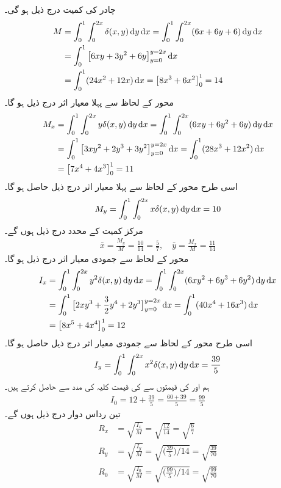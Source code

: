 چادر کی کمیت درج ذیل ہو گی۔
\begin{align*}
M&=\int_0^1\int_0^{2x}\delta(x,y)\dif y\dif x=\int_0^1\int_0^{2x}(6x+6y+6)\dif y\dif x\\
&=\int_0^1\big[6xy+3y^2+6y\big]_{y=0}^{y=2x}\dif x\\
&=\int_0^1(24x^2+12x)\dif x=\big[8x^3+6x^2\big]_0^1=14
\end{align*}
محور  کے لحاظ سے پہلا معیار اثر درج ذیل ہو گا۔
\begin{align*}
M_x&=\int_0^1\int_0^{2x}y\delta(x,y)\dif y\dif x=\int_0^1\int_0^{2x}(6xy+6y^2+6y)\dif y\dif x\\
&=\int_0^1\big[3xy^2+2y^3+3y^2\big]_{y=0}^{y=2x}\dif x=\int_0^1 (28x^3+12x^2)\dif x\\
&=\big[7x^4+4x^3\big]_0^1=11
\end{align*}
اسی طرح محور  کے  لحاظ سے پہلا معیار اثر درج ذیل حاصل ہو گا۔
\begin{align*}
M_y=\int_0^1\int_0^{2x}x\delta(x,y)\dif y\dif x=10
\end{align*}
مرکز کمیت کے محدد درج ذیل ہوں گے۔
\begin{align*}
\bar{x}=\frac{M_y}{M}=\frac{10}{14}=\frac{5}{7},\quad \bar{y}=\frac{M_x}{M}=\frac{11}{14}
\end{align*} 
محور  کے لحاظ  سے جمودی معیار اثر درج ذیل ہو گا۔
\begin{align*}
I_x&=\int_0^1\int_0^{2x}y^2\delta(x,y)\dif y\dif x=\int_0^1\int_0^{2x}(6xy^2+6y^3+6y^2)\dif y\dif x\\
&=\int_0^1\big[2xy^3+\frac{3}{2}y^4+2y^3\big]_{y=0}^{y=2x}\dif x=\int_0^1(40x^4+16x^3)\dif x\\
&=\big[8x^5+4x^4\big]_0^1=12
\end{align*}
اسی طرح  محور  کے لحاظ سے جمودی معیار اثر درج ذیل حاصل ہو گا۔
\begin{align*}
I_y=\int_0^1\int_0^{2x}x^2\delta(x,y)\dif y\dif x=\frac{39}{5}
\end{align*}
ہم  اور  کی قیمتوں سے  کی قیمت کلیہ  کی مدد  سے  حاصل کرتے ہیں۔
\begin{align*}
I_0=12+\frac{39}{5}=\frac{60+39}{5}=\frac{99}{5}
\end{align*}
تین رداس دوار درج ذیل ہوں گے۔
\begin{align*}
R_x&=\sqrt{\frac{I_x}{M}}=\sqrt{\frac{12}{14}}=\sqrt{\frac{6}{7}}\\
R_y&=\sqrt{\frac{I_y}{M}}=\sqrt{\big(\frac{39}{5}\big)/14}=\sqrt{\frac{39}{70}}\\
R_0&=\sqrt{\frac{I_0}{M}}=\sqrt{\big(\frac{99}{5}\big)/14}=\sqrt{\frac{99}{70}}
\end{align*}
